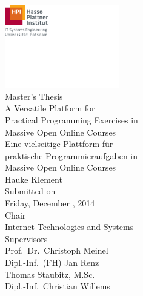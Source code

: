 \documentclass[a4paper, oneside]{book}
\begin{document}

\frontmatter


\begin{titlepage}
  \begin{center}
    \includegraphics[clip=true, trim=0 3.9cm 5.4cm 0, width=5cm]{images/hpi-logo.pdf}
    \\[2.5em]
    \Large
    Master's Thesis
    \\[1.5em]
    \LARGE
    A Versatile Platform for\\Practical Programming Exercises in\\Massive Open Online Courses
    \\[1em]
    Eine vielseitige Plattform für\\praktische Programmieraufgaben in\\Massive Open Online Courses
    \\[1.5em]
    \Large
    Hauke Klement
    \\[2.5em]
    \large
    Submitted on
    \\
    Friday, December , 2014
    \\[1.5em]
    Chair
    \\
    Internet Technologies and Systems
    \\[1.5em]
    Supervisors
    \\
    Prof.\ Dr.\ Christoph Meinel
    \\
    Dipl.-Inf.\ (FH) Jan Renz
    \\
    Thomas Staubitz, M.Sc.
    \\
    Dipl.-Inf.\ Christian Willems
  \end{center}
\end{titlepage}


\cleardoublepage
\end{document}
